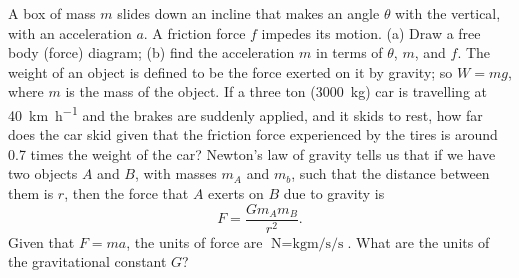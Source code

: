 \documentclass[a4paper]{exam}
\begin{document}
\begin{questions}
    \question A box of mass $ m $ slides down an incline that makes an angle $ \theta $ with the vertical, with an acceleration $ a $.
              A friction force $ f $ impedes its motion. (a) Draw a free body (force) diagram; (b) find the acceleration $ m $
              in terms of $ \theta $, $ m $, and $ f $.
    \question The weight of an object is defined to be the force exerted on it by gravity; so $ W = mg $, where $ m $ is the
              mass of the object. If a three ton (\SI{3000}{\kilo\gram}) car is travelling at \SI{40}{\kilo\metre\per\hour}
              and the brakes are suddenly applied, and it skids to rest, how far does the car skid given that the friction
              force experienced by the tires is around 0.7 times the weight of the car?
    \question Newton's law of gravity tells us that if we have two objects $ A $ and $ B $, with masses $ m_A $ and $ m_b $,
              such that the distance between them is $ r $, then the force that $ A $ exerts on $ B $ due to gravity is
              \begin{displaymath}
                F = \frac{Gm_A m_B}{r^2}.
              \end{displaymath}
              Given that $ F = ma $, the units of force are $ \si{\newton} = \si{\kilo\gram\metre\per\second\per\second} $. What
              are the units of the gravitational constant $ G $?
  \end{questions}
\end{document}
